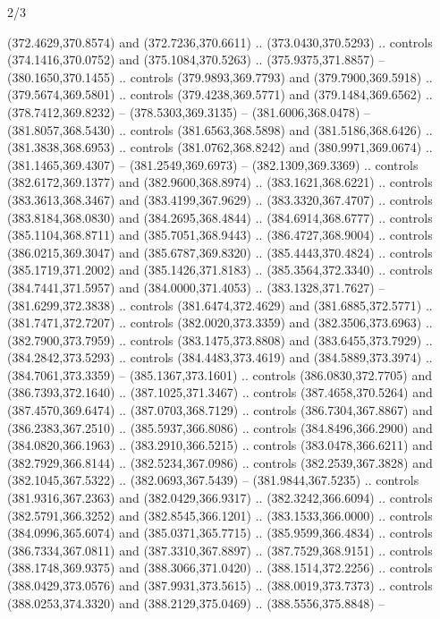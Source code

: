 \begin{flagdescription}{2/3}
\begin{scope}[xshift=0.5\flaglength,yshift=0.5\flagwidth,scale=\flagwidth/495.65]
\begin{scope}[y=0.8pt, x=0.8pt, yscale=-1,shift={(-463.76,-309.78)}]
  (372.4629,370.8574) and (372.7236,370.6611) .. (373.0430,370.5293) .. controls
  (374.1416,370.0752) and (375.1084,370.5263) .. (375.9375,371.8857) --
  (380.1650,370.1455) .. controls (379.9893,369.7793) and (379.7900,369.5918) ..
  (379.5674,369.5801) .. controls (379.4238,369.5771) and (379.1484,369.6562) ..
  (378.7412,369.8232) -- (378.5303,369.3135) -- (381.6006,368.0478) --
  (381.8057,368.5430) .. controls (381.6563,368.5898) and (381.5186,368.6426) ..
  (381.3838,368.6953) .. controls (381.0762,368.8242) and (380.9971,369.0674) ..
  (381.1465,369.4307) -- (381.2549,369.6973) -- (382.1309,369.3369) .. controls
  (382.6172,369.1377) and (382.9600,368.8974) .. (383.1621,368.6221) .. controls
  (383.3613,368.3467) and (383.4199,367.9629) .. (383.3320,367.4707) .. controls
  (383.8184,368.0830) and (384.2695,368.4844) .. (384.6914,368.6777) .. controls
  (385.1104,368.8711) and (385.7051,368.9443) .. (386.4727,368.9004) .. controls
  (386.0215,369.3047) and (385.6787,369.8320) .. (385.4443,370.4824) .. controls
  (385.1719,371.2002) and (385.1426,371.8183) .. (385.3564,372.3340) .. controls
  (384.7441,371.5957) and (384.0000,371.4053) .. (383.1328,371.7627) --
  (381.6299,372.3838) .. controls (381.6474,372.4629) and (381.6885,372.5771) ..
  (381.7471,372.7207) .. controls (382.0020,373.3359) and (382.3506,373.6963) ..
  (382.7900,373.7959) .. controls (383.1475,373.8808) and (383.6455,373.7929) ..
  (384.2842,373.5293) .. controls (384.4483,373.4619) and (384.5889,373.3974) ..
  (384.7061,373.3359) -- (385.1367,373.1601) .. controls (386.0830,372.7705) and
  (386.7393,372.1640) .. (387.1025,371.3467) .. controls (387.4658,370.5264) and
  (387.4570,369.6474) .. (387.0703,368.7129) .. controls (386.7304,367.8867) and
  (386.2383,367.2510) .. (385.5937,366.8086) .. controls (384.8496,366.2900) and
  (384.0820,366.1963) .. (383.2910,366.5215) .. controls (383.0478,366.6211) and
  (382.7929,366.8144) .. (382.5234,367.0986) .. controls (382.2539,367.3828) and
  (382.1045,367.5322) .. (382.0693,367.5439) -- (381.9844,367.5235) .. controls
  (381.9316,367.2363) and (382.0429,366.9317) .. (382.3242,366.6094) .. controls
  (382.5791,366.3252) and (382.8545,366.1201) .. (383.1533,366.0000) .. controls
  (384.0996,365.6074) and (385.0371,365.7715) .. (385.9599,366.4834) .. controls
  (386.7334,367.0811) and (387.3310,367.8897) .. (387.7529,368.9151) .. controls
  (388.1748,369.9375) and (388.3066,371.0420) .. (388.1514,372.2256) .. controls
  (388.0429,373.0576) and (387.9931,373.5615) .. (388.0019,373.7373) .. controls
  (388.0253,374.3320) and (388.2129,375.0469) .. (388.5556,375.8848) --

\end{scope}
\end{scope}
\end{flagdescription}
